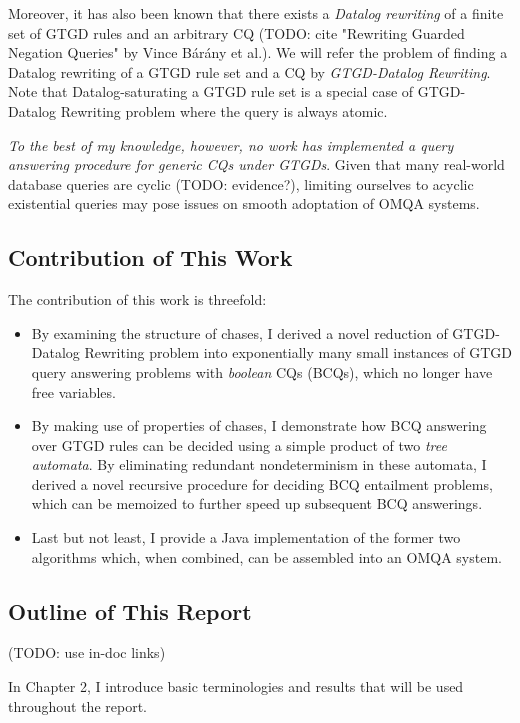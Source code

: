 \documentclass[12pt]{article}
\begin{document}
Moreover, it has also been known that there exists a \emph{Datalog rewriting} of a finite set of GTGD rules and an arbitrary CQ (TODO: cite "Rewriting Guarded Negation Queries" by Vince Bárány et al.). We will refer the problem of finding a Datalog rewriting of a GTGD rule set and a CQ by \emph{GTGD-Datalog Rewriting}. Note that Datalog-saturating a GTGD rule set is a special case of GTGD-Datalog Rewriting problem where the query is always atomic.

\emph{To the best of my knowledge, however, no work has implemented a query answering procedure for generic CQs under GTGDs}. Given that many real-world database queries are cyclic (TODO: evidence?), limiting ourselves to acyclic existential queries may pose issues on smooth adoptation of OMQA systems.

\subsection{Contribution of This Work}

The contribution of this work is threefold:

\begin{itemize}
  \item By examining the structure of chases, I derived a novel reduction of GTGD-Datalog Rewriting problem into exponentially many small instances of GTGD query answering problems with \emph{boolean} CQs (BCQs), which no longer have free variables.
  \item By making use of properties of chases, I demonstrate how BCQ answering over GTGD rules can be decided using a simple product of two \emph{tree automata}. By eliminating redundant nondeterminism in these automata, I derived a novel recursive procedure for deciding BCQ entailment problems, which can be memoized to further speed up subsequent BCQ answerings.
  \item Last but not least, I provide a Java implementation of the former two algorithms which, when combined, can be assembled into an OMQA system.
\end{itemize}

\subsection{Outline of This Report}

(TODO: use in-doc links)

In Chapter 2, I introduce basic terminologies and results that will be used throughout the report.
\end{document}
